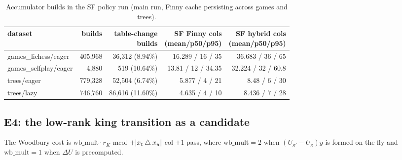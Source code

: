 \begin{table}[htbp]
\centering\small
\caption{Accumulator builds in the SF policy run (main run, Finny cache persisting across games and trees).}\label{tab:hybrid}
\begin{tabular}{@{}lrrrr@{}}
\toprule
dataset & builds & \hd{table-change\\builds} & \hd{SF Finny cols\\(mean/p50/p95)} & \hd{SF hybrid cols\\(mean/p50/p95)}\\
\midrule
games\_lichess/eager & 405,968 & 36,312 (8.94\%) & 16.289 / 16 / 35 & 36.683 / 36 / 65\\
games\_selfplay/eager & 4,880 & 519 (10.64\%) & 13.81 / 12 / 34.35 & 32.224 / 32 / 60.8\\
trees/eager & 779,328 & 52,504 (6.74\%) & 5.877 / 4 / 21 & 8.48 / 6 / 30\\
trees/lazy & 746,760 & 86,616 (11.60\%) & 4.635 / 4 / 10 & 8.436 / 7 / 28\\
\bottomrule
\end{tabular}
\end{table}

\subsection{E4: the low-rank king transition as a candidate}\label{sec:e4}

The Woodbury cost is $\mathrm{wb\_mult}\cdot r_K$ mcol $+|x_t\mathbin{\triangle} x_u|$ col $+1$ pass, where $\mathrm{wb\_mult}=2$ when $(U_{\kappa'}-U_\kappa)y$ is formed on the fly and $\mathrm{wb\_mult}=1$ when $\Delta U$ is precomputed.

